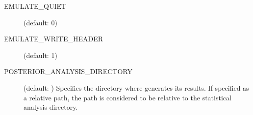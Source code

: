 \begin{description}
    \item[EMULATE\_QUIET] (default: 0)

    \item[EMULATE\_WRITE\_HEADER] (default: 1)

    \item[POSTERIOR\_ANALYSIS\_DIRECTORY] (default: ) Specifies the directory where  generates its results. If specified as a relative path, the path is considered to be relative to the statistical analysis directory.
\end{description}

